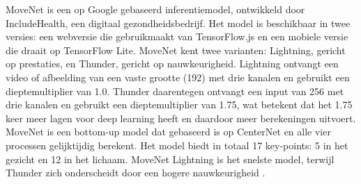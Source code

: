 MoveNet is een op Google gebaseerd inferentiemodel, ontwikkeld door IncludeHealth, een digitaal gezondheidsbedrijf.
Het model is beschikbaar in twee versies: een webversie die gebruikmaakt van TensorFlow.js en een mobiele versie die draait op TensorFlow Lite. 
MoveNet kent twee varianten: Lightning, gericht op prestaties, en Thunder, gericht op nauwkeurigheid. 
Lightning ontvangt een video of afbeelding van een vaste grootte (192) met drie kanalen en gebruikt een dieptemultiplier van 1.0. 
Thunder daarentegen ontvangt een input van 256 met drie kanalen en gebruikt een dieptemultiplier van 1.75, wat betekent dat het 1.75 keer meer lagen voor deep learning heeft en daardoor meer berekeningen uitvoert.
MoveNet is een bottom-up model dat gebaseerd is op CenterNet en alle vier processen gelijktijdig berekent. 
Het model biedt in totaal 17 key-points: 5 in het gezicht en 12 in het lichaam. 
MoveNet Lightning is het snelste model, terwijl Thunder zich onderscheidt door een hogere nauwkeurigheid \autocite{BeomjunEtAl2022}. 


